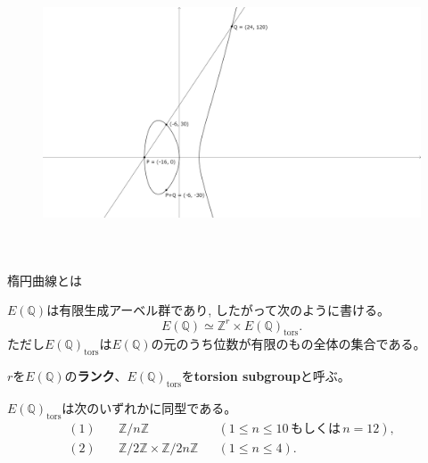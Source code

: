 \documentclass{classes/mybeamer}
\begin{document}
\begin{frame}
    \begin{figure}[htbp]
        \centering
        \includegraphics[keepaspectratio, height=8.5cm]{figures/3-4-5.png}
        \vspace{-1.5cm}
        \caption{
        }
    \end{figure}
\end{frame}

\begin{frame}{楕円曲線とは}
    \begin{thm}[Mordell]
        $E(\mathbb{Q})$は有限生成アーベル群であり, したがって次のように書ける。
        \begin{equation}
            E(\mathbb{Q}) \simeq \mathbb{Z}^r \times E(\mathbb{Q})_{\mathrm{tors}}.
        \end{equation}
        ただし$E(\mathbb{Q})_\mathrm{tors}$は$E(\mathbb{Q})$の元のうち位数が有限のもの全体の集合である。

        $r$を$E(\mathbb{Q})$の\color{blue}\textbf{ランク}\color{black}、$E(\mathbb{Q})_\mathrm{tors}$を\color{blue}\rm{\textbf{torsion subgroup}}\color{black}と呼ぶ。
    \end{thm}
    \begin{thm}[Mazur]
        \label{thm:mazur}
        $E(\mathbb{Q})_{\text{tors}}$は次のいずれかに同型である。
        \begin{equation}
            \begin{aligned}
                (1)\quad & \mathbb{Z}/n\mathbb{Z}                                &  & (1 \leq n \leq 10\,\mbox{もしくは}\,n=12), \\
                (2)\quad & \mathbb{Z}/2\mathbb{Z} \times \mathbb{Z}/2n\mathbb{Z} &  & (1 \leq n \leq 4).
            \end{aligned}
        \end{equation}
    \end{thm}
\end{frame}
\end{document}
